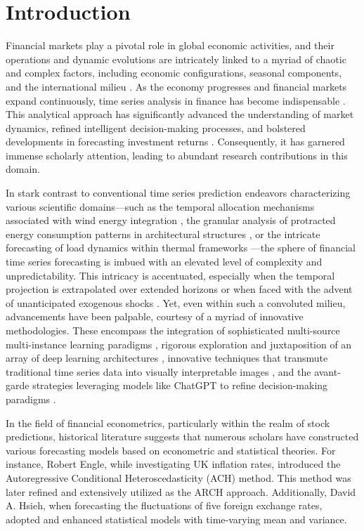 \documentclass[sn-mathphys,Numbered]{sn-jnl}
\theoremstyle{thmstyleone}%
\theoremstyle{thmstyletwo}%
\theoremstyle{thmstylethree}%
\begin{document}
\section{Introduction}\label{sec1}
Financial markets play a pivotal role in global economic activities, and their operations and dynamic evolutions are intricately linked to a myriad of chaotic and complex factors, including economic configurations, seasonal components, and the international milieu \cite{tsay2005analysis} \cite{mandelbrot2010mis}. As the economy progresses and financial markets expand continuously, time series analysis in finance has become indispensable \cite{brockwell2002introduction}. This analytical approach has significantly advanced the understanding of market dynamics, refined intelligent decision-making processes, and bolstered developments in forecasting investment returns \cite{huang1998empirical}\cite{mandelbrot2010mis}. Consequently, it has garnered immense scholarly attention, leading to abundant research contributions in this domain.

In stark contrast to conventional time series prediction endeavors characterizing various scientific domains—such as the temporal allocation mechanisms associated with wind energy integration \cite{huang2022wind}, the granular analysis of protracted energy consumption patterns in architectural structures \cite{li2023improving}, or the intricate forecasting of load dynamics within thermal frameworks \cite{gong2022load}—the sphere of financial time series forecasting is imbued with an elevated level of complexity and unpredictability. This intricacy is accentuated, especially when the temporal projection is extrapolated over extended horizons or when faced with the advent of unanticipated exogenous shocks \cite{lee2023financial}\cite{jerez2020effects}. Yet, even within such a convoluted milieu, advancements have been palpable, courtesy of a myriad of innovative methodologies. These encompass the integration of sophisticated multi-source multi-instance learning paradigms \cite{zhang2018stock}, rigorous exploration and juxtaposition of an array of deep learning architectures \cite{kurani2023comprehensive}, innovative techniques that transmute traditional time series data into visually interpretable images \cite{sezer2018algorithmic}, and the avant-garde strategies leveraging models like ChatGPT to refine decision-making paradigms \cite{zaremba2023chatgpt}.

In the field of financial econometrics, particularly within the realm of stock predictions, historical literature suggests that numerous scholars have constructed various forecasting models based on econometric and statistical theories. For instance, Robert Engle, while investigating UK inflation rates, introduced the Autoregressive Conditional Heteroscedasticity (ACH) method\cite{engle1982autoregressive}. This method was later refined and extensively utilized as the ARCH approach\cite{bollerslev1986generalized}. Additionally, David A. Hsieh, when forecasting the fluctuations of five foreign exchange rates, adopted and enhanced statistical models with time-varying mean and variance\cite{hsieh1988statistical}.
\end{document}
